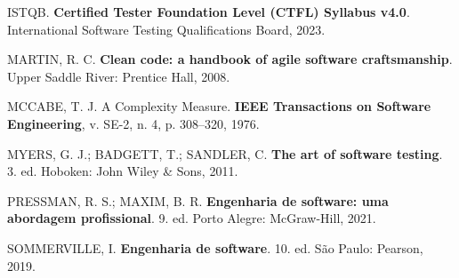 \documentclass[12pt,a4paper]{article}
\begin{document}
\vspace{0.3cm}
\noindent ISTQB. \textbf{Certified Tester Foundation Level (CTFL) Syllabus v4.0}. International Software Testing Qualifications Board, 2023.

\vspace{0.3cm}
\noindent MARTIN, R. C. \textbf{Clean code: a handbook of agile software craftsmanship}. Upper Saddle River: Prentice Hall, 2008.

\vspace{0.3cm}
\noindent MCCABE, T. J. A Complexity Measure. \textbf{IEEE Transactions on Software Engineering}, v. SE-2, n. 4, p. 308--320, 1976.

\vspace{0.3cm}
\noindent MYERS, G. J.; BADGETT, T.; SANDLER, C. \textbf{The art of software testing}. 3. ed. Hoboken: John Wiley \& Sons, 2011.

\vspace{0.3cm}
\noindent PRESSMAN, R. S.; MAXIM, B. R. \textbf{Engenharia de software: uma abordagem profissional}. 9. ed. Porto Alegre: McGraw-Hill, 2021.

\vspace{0.3cm}
\noindent SOMMERVILLE, I. \textbf{Engenharia de software}. 10. ed. São Paulo: Pearson, 2019.
\end{document}
